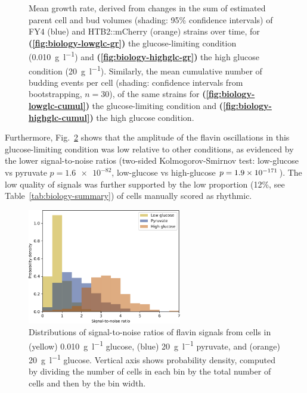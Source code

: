 \begin{figure}[htbp!]
  \caption[
    Mean growth rate, derived from changes in the sum of estimated parent cell and bud volumes
    of FY4 and HTB2::mCherry strains over time during the glucose-starvation experiment, for
    the glucose-limiting condition and
    the high glucose condition.
    Similarly, the mean cumulative number of budding events per cell.
  ]{
    Mean growth rate, derived from changes in the sum of estimated parent cell and bud volumes (shading: 95\% confidence intervals) of FY4 (blue) and HTB2::mCherry (orange) strains over time, for \textbf{(\ref{fig:biology-lowglc-gr})} the glucose-limiting condition (\SI{0.010}{\gram~\litre^{-1}}) and \textbf{(\ref{fig:biology-highglc-gr})} the high glucose condition (\SI{20}{\gram~\litre^{-1}}).
    Similarly, the mean cumulative number of budding events per cell (shading: confidence intervals from bootstrapping, $n=30$), of the same strains for \textbf{(\ref{fig:biology-lowglc-cumul})} the glucose-limiting condition and \textbf{(\ref{fig:biology-highglc-cumul})} the high glucose condition.
  }
  \label{fig:biology-lowglc-gr-budprob}
\end{figure}

Furthermore, Fig.\ \ref{fig:biology-compare-snr} shows that the amplitude of the flavin oscillations in this glucose-limiting condition was low relative to other conditions, as evidenced by the lower signal-to-noise ratios (two-sided Kolmogorov-Smirnov test: low-glucose vs pyruvate $p = \num{1.6e-82}$, low-glucose vs high-glucose $p = \num{1.9d-171}$).
The low quality of signals was further supported by the low proportion (12\%, see Table~\ref{tab:biology-summary}) of cells manually scored as rhythmic.

\begin{figure}[htbp!]
  \centering
  \includegraphics[width=0.6\textwidth]{csource_snrs_edit}

  \caption[
    Distributions of signal-to-noise ratios of flavin signals from cells in
    \SI{0.010}{\gram~\litre^{-1}} glucose,
    \SI{20}{\gram~\litre^{-1}} pyruvate, and
    \SI{20}{\gram~\litre^{-1}} glucose.
  ]{
    Distributions of signal-to-noise ratios of flavin signals from cells in
    (yellow) \SI{0.010}{\gram~\litre^{-1}} glucose,
    (blue) \SI{20}{\gram~\litre^{-1}} pyruvate, and
    (orange) \SI{20}{\gram~\litre^{-1}} glucose.
    Vertical axis shows probability density, computed by dividing the number of cells in each bin by the total number of cells and then by the bin width.
  }
  \label{fig:biology-compare-snr}
\end{figure}

